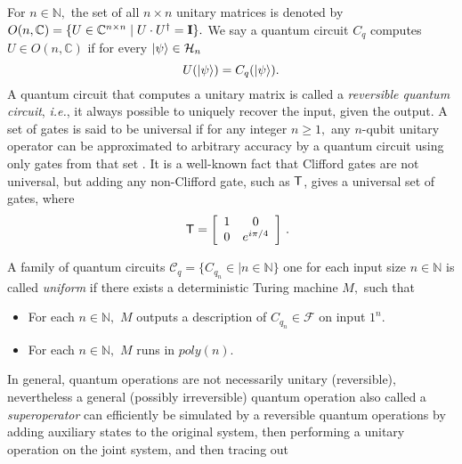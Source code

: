\begin{definition}
For $n\in \mathbb{N},$ the set of all $n\times n$ unitary matrices is denoted by $O(n,\mathbb{C})=\{U\in \mathbb{C}^{n\times n} \mid U\cdot U^\dagger={\bf I}\}.$ We say a quantum circuit $C_q$ computes $U\in O(n,\mathbb{C})$ if for every ${\lvert}\psi\rangle\in \mathcal{H}_n$
$$U({\lvert}\psi\rangle)=C_q({\lvert}\psi\rangle).$$ 
A quantum circuit that computes a unitary matrix is called a \emph{reversible  quantum circuit}, \emph{i.e.}, it always possible to uniquely recover the input, given the output. A set of gates is said to be universal if for any integer $n \geq 1,$ any $n$-qubit unitary operator can be approximated to arbitrary accuracy by a quantum circuit using only gates from that set \cite{KLM07}. It is a well-known fact that Clifford gates are not universal, but adding any non-Clifford gate, such as ${\sf T}$, gives a universal set of gates, where
$$\quad{\sf T} = \left[\begin{array}{cc} 1 & 0\\ 0 & e^{i\pi/4}\end{array}\right]\,.$$ 
    
A family of quantum circuits $\mathcal{C}_q=\{C_{q_n}\in\mid n\in \mathbb{N}  \}$   one for each input  size $n\in \mathbb{N}$ is called \emph{uniform} if there exists a deterministic Turing machine $M,$ such that
 \begin{itemize}
 \item For each $n\in\mathbb{N},$ $M$ outputs a description of $C_{q_n} \in \mathcal{F}$ on input $1^n.$
 \item  For each $n\in\mathbb{N},$ $M$ runs in $poly(n).$
 \end{itemize}

In general, quantum operations are not necessarily unitary (reversible), nevertheless a general (possibly irreversible) quantum operation also called a \emph{superoperator} can efficiently be simulated by a reversible quantum operations by adding auxiliary states to the original system, then performing a unitary operation on the joint system, and then tracing out %


\end{definition}
